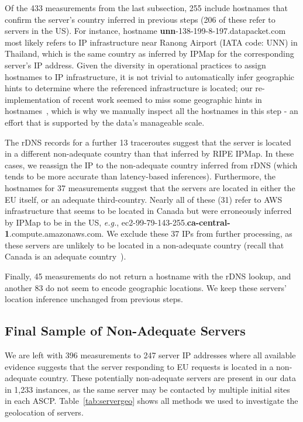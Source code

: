 Of the 433 measurements from the last subsection, 255 include
hostnames that confirm the server's country inferred in previous steps
(206 of these refer to servers in the US).
For instance, hostname \textbf{unn}-138-199-8-197.datapacket.com most likely 
refers to IP infrastructure near 
Ranong Airport (IATA code: UNN) in Thailand, which is the same country as inferred 
by IPMap for the corresponding server's IP address.
Given the diversity in operational practices to assign hostnames to IP infrastructure, 
it is not trivial to automatically
infer geographic hints to determine where the referenced infrastructure
is located; our re-implementation of recent work seemed to miss some geographic hints in hostnames~\cite{geodns}, 
which is why we manually inspect all the hostnames in this step - an 
effort that is supported by the data's manageable scale.

The rDNS records for a further 13 traceroutes suggest that the server is located in 
a different non-adequate country than that inferred by RIPE IPMap. In these cases,
we reassign the IP to the non-adequate country inferred from rDNS 
(which tends to be more accurate than latency-based inferences). 
Furthermore, the hostnames for 37 measurements suggest that the servers are located in either the EU
itself, or an adequate third-country. Nearly all of these (31) refer to AWS infrastructure 
that seems to be located in Canada but were erroneously inferred by IPMap to be in the US,
\textit{e.g.}, ec2-99-79-143-255.\textbf{ca-central-1}.compute.amazonaws.com.
We exclude these 37 IPs from further processing, as these servers are unlikely to be located in a non-adequate 
country (recall that Canada is an adequate country~\cite{Adequacy38:online}).  

Finally, 45 measurements do not return a hostname with the rDNS lookup, 
and another 83 do not seem to encode geographic locations.  We keep these servers' location 
inference unchanged from previous steps. 

\subsection{Final Sample of Non-Adequate Servers}
\label{subsec:finalsample}
We are left with 396 measurements to 247 server IP addresses where all available
evidence suggests that the server responding to EU requests is located in a non-adequate country.
These potentially non-adequate servers are present in our data in 1,233 instances,
as the same server may be contacted by multiple initial sites in each ASCP. 
Table~\ref{tab:servergeo} shows all methods we used to investigate the geolocation of servers.

